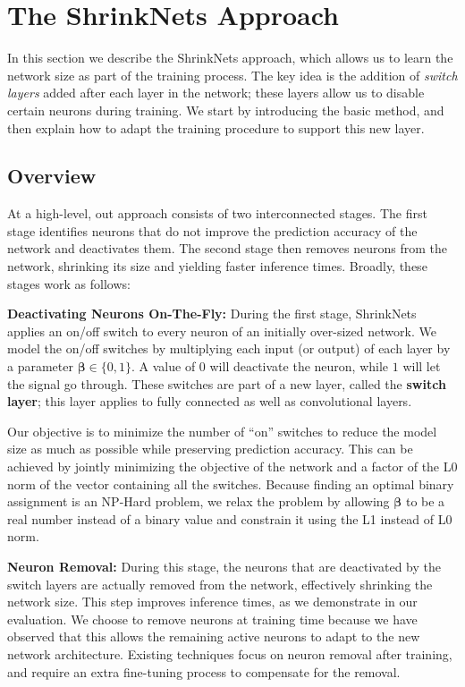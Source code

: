 
\section{The ShrinkNets Approach}

In this section we describe the ShrinkNets approach, which allows us to learn
the network size as part of the training process. The key idea is the addition
of \emph{switch layers} added after each layer in the network;  these layers
allow us to disable certain neurons during training.  We start by introducing the
basic method, and then explain how to adapt the training procedure to support this new
layer. 

\subsection{Overview}

At a high-level, out approach consists of two interconnected stages.
The first stage identifies neurons that do not improve the
prediction accuracy of the network and deactivates them. The second stage then
removes neurons from the network, shrinking its
size and yielding faster inference times. Broadly, these stages work as follows:

\noindent\textbf{Deactivating Neurons On-The-Fly: }During the first stage,
ShrinkNets applies an on/off switch to every neuron of an initially over-sized
network. We model the on/off switches by multiplying each input (or output) of
each layer by a parameter $\bm{\beta}\in\{0,1\}$. A value of $0$
will deactivate the neuron, while $1$ will let the signal go through. These
switches are part of a new layer, called the \textbf{switch layer}; this layer applies 
to fully connected as well as convolutional layers.

Our objective is to minimize the number of ``on'' switches to reduce the model size as much
as possible while preserving prediction accuracy. This can be achieved by jointly
minimizing the objective of the network and a factor of the L0 norm of the
vector containing all the switches. Because finding an optimal binary
assignment is an NP-Hard problem, we relax the problem by allowing
 $\bm{\beta}$ to be a real number
instead of a binary value and constrain it using the L1 instead of L0 norm.

\noindent\textbf{Neuron Removal: } During this stage, the neurons that are
deactivated by the switch layers are actually removed from the network,
effectively shrinking the network size. This step improves inference times, as
we demonstrate in our evaluation. We choose to remove neurons at training time
because we have observed that this allows the remaining active neurons to adapt
to the new network architecture. Existing techniques focus on neuron removal
after training, and require an extra fine-tuning process to compensate for the
removal. 


